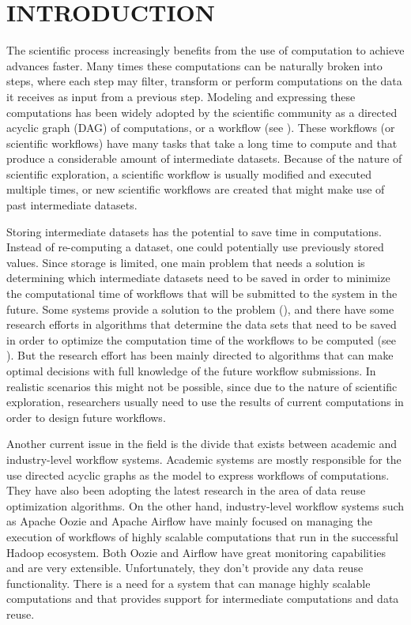 \chapter{INTRODUCTION}
\label{chap:introduction}
The scientific process increasingly benefits from the use of computation to achieve advances faster. Many times these computations can be naturally broken into steps, where each step may filter, transform or perform computations on the data it receives as input from a previous step.  Modeling and expressing these computations has been widely adopted by the scientific community as a directed acyclic graph (DAG) of computations, or a workflow (see \cite{liu2015survey}).  These workflows (or scientific workflows) have many tasks that take a long time to compute and that produce a considerable amount of intermediate datasets.  Because of the nature of scientific exploration, a scientific workflow is usually modified and executed multiple times, or new scientific workflows are created that might make use of past intermediate datasets.  

Storing intermediate datasets has the potential to save time in computations. Instead of re-computing a dataset, one could potentially use previously stored values. Since storage is limited, one main problem that needs a solution is determining which intermediate datasets need to be saved in order to minimize the computational time of workflows that will be submitted to the system in the future. Some systems provide a solution to the problem (\cite{yuan2012data}), and there have some research efforts in algorithms that determine the data sets that need to be saved in order to optimize the computation time of the workflows to be computed (see \cite{zohrevandi2013bounded}). But the research effort has been mainly directed to algorithms that can make optimal decisions with full knowledge of the future workflow submissions.  In realistic scenarios this might not be possible, since due to the nature of scientific exploration, researchers usually need to use the results of current computations in order to design future workflows.

Another current issue in the field is the divide that exists between academic and industry-level workflow systems.  Academic systems are mostly responsible for the use directed acyclic graphs as the model to express workflows of computations.  They have also been adopting the latest research in the area of data reuse optimization algorithms.  On the other hand, industry-level workflow systems such as Apache Oozie and Apache Airflow have mainly focused on managing the execution of workflows of highly scalable computations that run in the successful Hadoop ecosystem. Both Oozie and Airflow have great monitoring capabilities and are very extensible. Unfortunately, they don't provide any data reuse functionality.  There is a need for a system that can manage highly scalable computations and that provides support for intermediate computations and data reuse.

